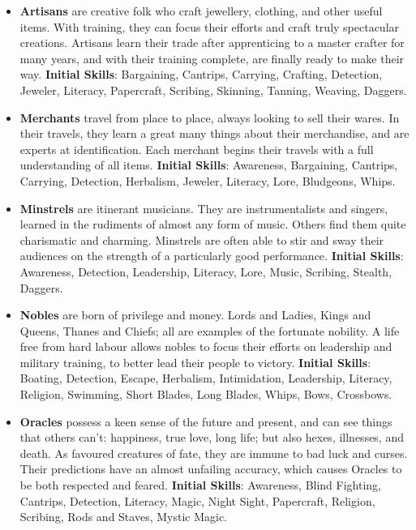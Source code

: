 \begin{itemize}
\item {\bf Artisans} are creative folk who craft jewellery, clothing, and 
other useful items.  With training, they can focus their efforts and craft 
truly spectacular creations.  Artisans learn their trade after apprenticing
to a master crafter for many years, and with their training complete, are
finally ready to make their way.  \textbf{Initial Skills}: Bargaining,
Cantrips, Carrying, Crafting, Detection, Jeweler, Literacy, Papercraft, 
Scribing, Skinning, Tanning, Weaving, Daggers.

\item {\bf Merchants} travel from place to place, always looking to sell 
their wares.  In their travels, they learn a great many things about their 
merchandise, and are experts at identification.  Each merchant begins their
travels with a full understanding of all items.
\textbf{Initial Skills}: Awareness, Bargaining, Cantrips, Carrying,
Detection, Herbalism, Jeweler, Literacy, Lore, Bludgeons, Whips.

\item {\bf Minstrels} are itinerant musicians.  They are instrumentalists 
and singers, learned in the rudiments of almost any form of music.  Others 
find them quite charismatic and charming.  Minstrels are often able to stir
and sway their audiences on the strength of a particularly good performance.
\textbf{Initial Skills}: Awareness, Detection, Leadership, Literacy, Lore, 
Music, Scribing, Stealth, Daggers.

\item {\bf Nobles} are born of privilege and money.  Lords and Ladies, 
Kings and Queens, Thanes and Chiefs; all are examples of the fortunate 
nobility.  A life free from hard labour allows nobles to focus their 
efforts on leadership and military training, to better lead their people 
to victory.  \textbf{Initial Skills}: Boating, Detection, Escape, 
Herbalism, Intimidation, Leadership, Literacy, Religion, Swimming, 
Short Blades, Long Blades, Whips, Bows, Crossbows.

\item {\bf Oracles} possess a keen sense of the future and present, and can
see things that others can't: happiness, true love, long life; but also 
hexes, illnesses, and death.  As favoured creatures of fate, they are 
immune to bad luck and curses.  Their predictions have an almost unfailing 
accuracy, which causes Oracles to be both respected and feared.
\textbf{Initial Skills}: Awareness, Blind Fighting, Cantrips, Detection,
Literacy, Magic, Night Sight, Papercraft, Religion, Scribing, Rods and
Staves, Mystic Magic.


\end{itemize}
